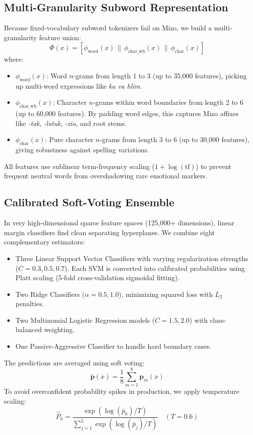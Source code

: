 \documentclass[conference]{IEEEtran}
\begin{document}
\subsection{Multi-Granularity Subword Representation}
Because fixed-vocabulary subword tokenizers fail on Mizo, we build a multi-granularity feature union:
\begin{equation}
    \Phi(x) = \left[ \phi_{\text{word}}(x) \,\|\, \phi_{\text{char\_wb}}(x) \,\|\, \phi_{\text{char}}(x) \right]
\end{equation}
where:
\begin{itemize}
    \item $\phi_{\text{word}}(x)$: Word $n$-grams from length 1 to 3 (up to 35,000 features), picking up multi-word expressions like \textit{ka va hlim}.
    \item $\phi_{\text{char\_wb}}(x)$: Character $n$-grams within word boundaries from length 2 to 6 (up to 60,000 features). By padding word edges, this captures Mizo affixes like \textit{-tak}, \textit{-lutuk}, \textit{-zia}, and root stems.
    \item $\phi_{\text{char}}(x)$: Pure character $n$-grams from length 3 to 6 (up to 30,000 features), giving robustness against spelling variations.
\end{itemize}
All features use sublinear term-frequency scaling ($1 + \log(\text{tf})$) to prevent frequent neutral words from overshadowing rare emotional markers.

\subsection{Calibrated Soft-Voting Ensemble}
In very high-dimensional sparse feature spaces (125,000+ dimensions), linear margin classifiers find clean separating hyperplanes. We combine eight complementary estimators:
\begin{itemize}
    \item Three Linear Support Vector Classifiers with varying regularization strengths ($C = 0.3, 0.5, 0.7$). Each SVM is converted into calibrated probabilities using Platt scaling (5-fold cross-validation sigmoidal fitting).
    \item Two Ridge Classifiers ($\alpha = 0.5, 1.0$), minimizing squared loss with $L_2$ penalties.
    \item Two Multinomial Logistic Regression models ($C = 1.5, 2.0$) with class-balanced weighting.
    \item One Passive-Aggressive Classifier to handle hard boundary cases.
\end{itemize}
The predictions are averaged using soft voting:
\begin{equation}
    \bar{\mathbf{p}}(x) = \frac{1}{8} \sum_{m=1}^{8} \mathbf{p}_m(x)
\end{equation}
To avoid overconfident probability spikes in production, we apply temperature scaling:
\begin{equation}
    \hat{P}_k = \frac{\exp(\log(\bar{p}_k) / T)}{\sum_{j=1}^{5} \exp(\log(\bar{p}_j) / T)} \quad (T = 0.6)
\end{equation}
\end{document}
